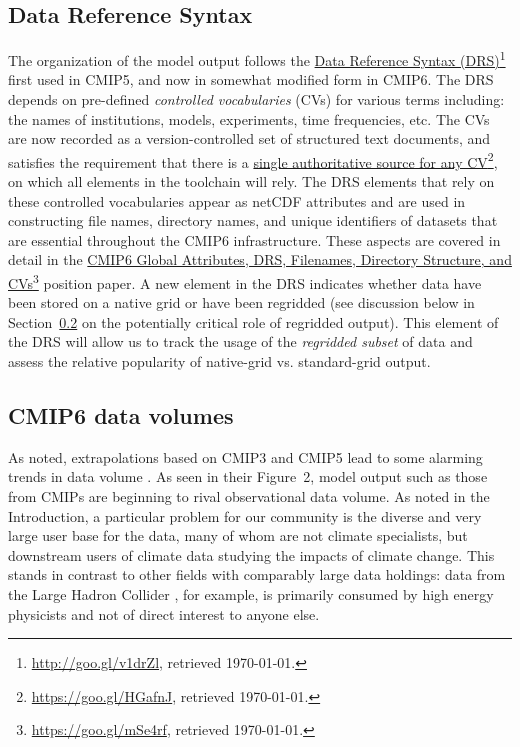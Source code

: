 \documentclass[gmd,manuscript]{copernicus}
\newcommand{\pllabel}[1]{\label{p-#1}\linelabel{l-#1}}
\newcommand{\urlref}[2] {\href{#1}{#2}\footnote{\url{#1}, retrieved \today.}}
\begin{document}
\subsection{Data Reference Syntax}
\label{sec:data-drs}

The organization of the model output follows the
\urlref{http://goo.gl/v1drZl}{Data Reference Syntax (DRS)} first used
in CMIP5, and now in somewhat modified form in CMIP6. The DRS depends
on pre-defined \emph{controlled vocabularies} (CVs) for various terms
including: the names of institutions, models, experiments, time
frequencies, etc. The CVs are now recorded as a version-controlled set
of structured text documents, and satisfies the requirement that there
is a \urlref{https://goo.gl/HGafnJ}{single authoritative source for
  any CV}, on which all elements in the toolchain will rely. The DRS
elements that rely on these controlled vocabularies appear as netCDF
attributes and are used in constructing file names, directory names,
and unique identifiers of datasets that are essential throughout the
CMIP6 infrastructure. These aspects are covered in detail in the
\urlref{https://goo.gl/mSe4rf}{CMIP6 Global Attributes, DRS,
  Filenames, Directory Structure, and CVs} position paper. A new
element in the DRS indicates whether data have been stored on a native
grid or have been regridded (see discussion below in
Section~\ref{sec:dvol} on the potentially critical role of regridded
output). This element of the DRS will allow us to track the usage of
the \emph{regridded subset} of data and assess the relative
popularity of native-grid vs. standard-grid output.

\subsection{CMIP6 data volumes}
\label{sec:dvol}

As noted, extrapolations based on CMIP3 and CMIP5 lead to some
alarming trends in data volume \citep[see
e.g.,][]{ref:overpecketal2011}.
\pllabel{RC3-10}
As seen in their Figure~2, model output such as those from CMIPs are
beginning to rival observational data volume. As noted in the
Introduction, a particular problem for our community is the diverse
and very large user base for the data, many of whom are not climate
specialists, but downstream users of climate data studying the impacts
of climate change. This stands in contrast to other fields with
comparably large data holdings: data from the Large Hadron Collider
\citep[e.g.,][]{ref:aadetal2008}, for example, is primarily consumed by
high energy physicists and not of direct interest to anyone else.
\end{document}
